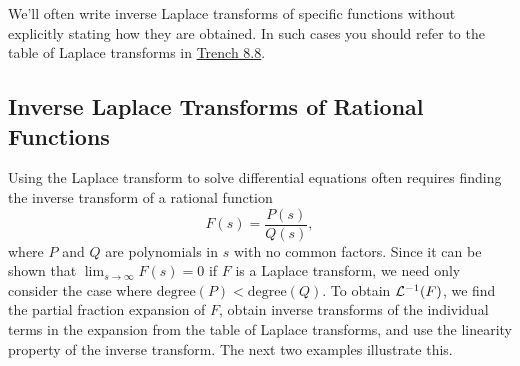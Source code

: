 \documentclass{ximera}
\begin{document}
\begin{remark}
We'll often write inverse Laplace transforms of specific
functions without explicitly stating how they are obtained. In such
cases you should refer to the table of Laplace transforms in \href{https://xerxes.ximera.org/differentialequations/main/laplaceTable/laplaceTable}{Trench 8.8}.
\end{remark}

\subsection*{Inverse Laplace Transforms of Rational Functions}

Using the Laplace transform to
 solve differential equations
often requires  finding the inverse
transform of a rational function
$$
F(s)=\frac{P(s)}{Q(s)},
$$
where $P$ and $Q$ are polynomials in $s$ with no common factors. Since
it can be shown that $\lim_{s\rightarrow\infty}F(s)=0$ if $F$ is a Laplace
transform, we need only consider the case where
$\mbox{degree}(P)<\mbox{degree}(Q)$. To obtain ${\cal L}^{-1}(F)$, we
find the partial fraction expansion of $F$, obtain inverse transforms
of the individual terms in the expansion from the table of Laplace
transforms, and use the linearity property of the inverse transform.
The next two examples illustrate this.
\end{document}
